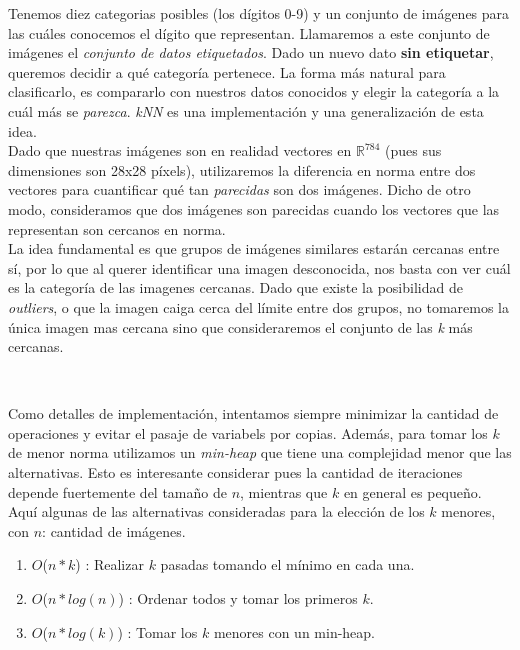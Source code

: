 Tenemos diez categorias posibles (los dígitos 0-9) y un conjunto de imágenes para las cuáles conocemos el dígito que representan. Llamaremos a este conjunto de imágenes el \textit{conjunto de datos etiquetados}. Dado un nuevo dato \textbf{sin etiquetar}, queremos decidir a qué categoría pertenece. La forma más natural para clasificarlo, es compararlo con nuestros datos conocidos y elegir la categoría a la cuál más se \textit{parezca}. \textit{kNN} es una implementación y una generalización de esta idea. \\

Dado que nuestras imágenes son en realidad vectores en $\mathbb{R}^{784}$ (pues sus dimensiones son 28x28 píxels), utilizaremos la diferencia en norma entre dos vectores para cuantificar qué tan \textit{parecidas} son dos imágenes. Dicho de otro modo, consideramos que dos imágenes son parecidas cuando los vectores que las representan son cercanos en norma. \\

La idea fundamental es que grupos de imágenes similares estarán cercanas entre sí, por lo que al querer identificar una imagen desconocida, nos basta con ver cuál es la categoría de las imagenes cercanas. Dado que existe la posibilidad de \textit{outliers}, o que la imagen caiga cerca del límite entre dos grupos, no tomaremos la única imagen mas cercana sino que consideraremos el conjunto de las \textit{k} más cercanas. \\



$ $\newline

Como detalles de implementación, intentamos siempre minimizar la cantidad de operaciones y evitar el pasaje de variabels por copias. Además, para tomar los $k$ de menor norma utilizamos un \textit{min-heap} que tiene una complejidad menor que las alternativas. Esto es interesante considerar pues la cantidad de iteraciones depende fuertemente del tamaño de $n$, mientras que $k$ en general es pequeño.\\

Aquí algunas de las alternativas consideradas para la elección de los $k$ menores, con $n$: cantidad de imágenes.

\begin{enumerate}
\item $O$($n * k$) : Realizar $k$ pasadas tomando el mínimo en cada una.
\item $O$($n * log(n)$) : Ordenar todos y tomar los primeros $k$.
\item $O$($n * log(k)$) : Tomar los $k$ menores con un min-heap.
\end{enumerate}

